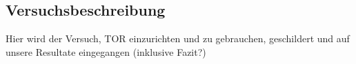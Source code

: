 \subsection{Versuchsbeschreibung}
Hier wird der Versuch, TOR einzurichten und zu gebrauchen, geschildert und auf unsere Resultate eingegangen (inklusive Fazit?)


